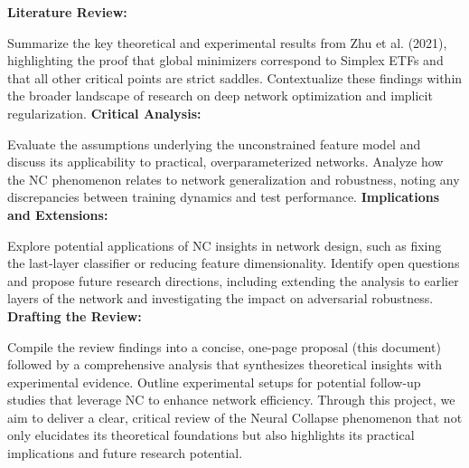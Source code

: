 \documentclass[11pt]{article}
\begin{document}
\textbf{Literature Review:}

Summarize the key theoretical and experimental results from Zhu et al. (2021), highlighting the proof that global minimizers correspond to Simplex ETFs and that all other critical points are strict saddles.
Contextualize these findings within the broader landscape of research on deep network optimization and implicit regularization.
\textbf{Critical Analysis:}

Evaluate the assumptions underlying the unconstrained feature model and discuss its applicability to practical, overparameterized networks.
Analyze how the NC phenomenon relates to network generalization and robustness, noting any discrepancies between training dynamics and test performance.
\textbf{Implications and Extensions:}

Explore potential applications of NC insights in network design, such as fixing the last-layer classifier or reducing feature dimensionality.
Identify open questions and propose future research directions, including extending the analysis to earlier layers of the network and investigating the impact on adversarial robustness.
\textbf{Drafting the Review:}

Compile the review findings into a concise, one-page proposal (this document) followed by a comprehensive analysis that synthesizes theoretical insights with experimental evidence.
Outline experimental setups for potential follow-up studies that leverage NC to enhance network efficiency.
Through this project, we aim to deliver a clear, critical review of the Neural Collapse phenomenon that not only elucidates its theoretical foundations but also highlights its practical implications and future research potential.





\printbibliography
\end{document}
